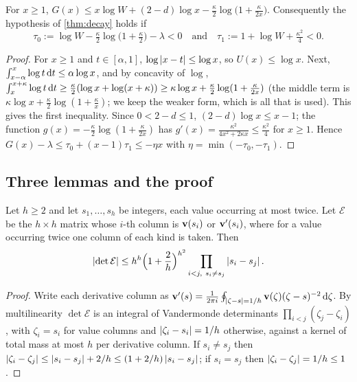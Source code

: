 \begin{lemma}\label{lem:tail}
For $x\ge1$, $G(x)\le x\log W+(2-d)\log x-\frac\kappa2\log\bigl(1+\frac\kappa{2x}\bigr)$.
Consequently the hypothesis of \cref{thm:decay} holds if
\[
  \tau_0:=\log W-\tfrac\kappa2\log\bigl(1+\tfrac\kappa2\bigr)-\lambda<0\quad\text{and}\quad
  \tau_1:=1+\log W+\tfrac{\kappa^2}4<0 .
\]
\end{lemma}

\begin{proof}
For $x\ge1$ and $t\in[\alpha,1]$, $\log\left\lvert x-t\right\rvert\le\log x$, so $U(x)\le\log x$. Next,
$\int_{x-\alpha}^x\log t\,\mathrm{d} t\le\alpha\log x$, and by concavity of $\log$,
$\int_x^{x+\kappa}\log t\,\mathrm{d} t\ge\frac\kappa2(\log x+\log(x+\kappa))\ge\kappa\log
x+\frac\kappa2\log(1+\frac\kappa{2x})$ (the middle term is
$\kappa\log x+\frac\kappa2\log(1+\frac\kappa x)$; we keep the weaker form, which is all that is used).
This gives the first inequality. Since $0<2-d\le1$,
$(2-d)\log x\le x-1$; the function $g(x)=-\frac\kappa2\log(1+\frac\kappa{2x})$ has
$g'(x)=\frac{\kappa^2}{4x^2+2\kappa x}\le\frac{\kappa^2}4$ for $x\ge1$. Hence
$G(x)-\lambda\le\tau_0+(x-1)\tau_1\le-\eta x$ with $\eta=\min(-\tau_0,-\tau_1)$.
\end{proof}

\subsection{Three lemmas and the proof}\label{subsec:decay-lemmas}

\begin{lemma}\label{lem:derivative-minors}
Let $h\ge2$ and let $s_1,\dots,s_h$ be integers, each value occurring at most twice. Let
$\mathcal E$ be the $h\times h$ matrix whose $i$-th column is $\mathbf{v}(s_i)$ or $\mathbf{v}'(s_i)$, where
for a value occurring twice one column of each kind is taken. Then
\[
  \left\lvert \det\mathcal E\right\rvert\le h^h\Bigl(1+\frac2h\Bigr)^{h^2}\prod_{i<j,\ s_i\ne s_j}\left\lvert s_i-s_j\right\rvert.
\]
\end{lemma}

\begin{proof}
Write each derivative column as $\mathbf{v}'(s)=\frac1{2\pi i}\oint_{\left\lvert \zeta-s\right\rvert=1/h}
\mathbf{v}(\zeta)(\zeta-s)^{-2}\,\mathrm{d}\zeta$. By multilinearity $\det\mathcal E$ is an integral of
Vandermonde determinants $\prod_{i<j}(\zeta_j-\zeta_i)$, with $\zeta_i=s_i$ for value columns
and $\left\lvert \zeta_i-s_i\right\rvert=1/h$ otherwise, against a kernel of total mass at most $h$ per derivative
column. If $s_i\ne s_j$ then $\left\lvert \zeta_i-\zeta_j\right\rvert\le\left\lvert s_i-s_j\right\rvert+2/h\le(1+2/h)\left\lvert s_i-s_j\right\rvert$;
if $s_i=s_j$ then $\left\lvert \zeta_i-\zeta_j\right\rvert=1/h\le1$.
\end{proof}

